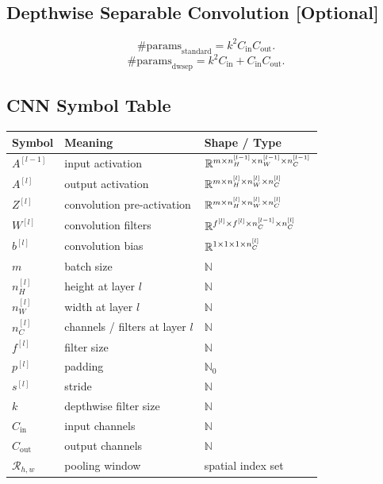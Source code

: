 \subsection{Depthwise Separable Convolution \textbf{[Optional]}}

\[
\#\mathrm{params}_{\mathrm{standard}}
=
k^2 C_{\mathrm{in}} C_{\mathrm{out}}.
\]
\[
\#\mathrm{params}_{\mathrm{dwsep}}
=
k^2 C_{\mathrm{in}}
+
C_{\mathrm{in}} C_{\mathrm{out}}.
\]

\subsection{CNN Symbol Table}

\begin{center}
\begin{tabular}{lll}
\toprule
Symbol & Meaning & Shape / Type \\
\midrule
$A^{[l-1]}$ & input activation & $\mathbb{R}^{m \times n_H^{[l-1]} \times n_W^{[l-1]} \times n_C^{[l-1]}}$ \\
$A^{[l]}$ & output activation & $\mathbb{R}^{m \times n_H^{[l]} \times n_W^{[l]} \times n_C^{[l]}}$ \\
$Z^{[l]}$ & convolution pre-activation & $\mathbb{R}^{m \times n_H^{[l]} \times n_W^{[l]} \times n_C^{[l]}}$ \\
$W^{[l]}$ & convolution filters & $\mathbb{R}^{f^{[l]} \times f^{[l]} \times n_C^{[l-1]} \times n_C^{[l]}}$ \\
$b^{[l]}$ & convolution bias & $\mathbb{R}^{1 \times 1 \times 1 \times n_C^{[l]}}$ \\
$m$ & batch size & $\mathbb{N}$ \\
$n_H^{[l]}$ & height at layer $l$ & $\mathbb{N}$ \\
$n_W^{[l]}$ & width at layer $l$ & $\mathbb{N}$ \\
$n_C^{[l]}$ & channels / filters at layer $l$ & $\mathbb{N}$ \\
$f^{[l]}$ & filter size & $\mathbb{N}$ \\
$p^{[l]}$ & padding & $\mathbb{N}_0$ \\
$s^{[l]}$ & stride & $\mathbb{N}$ \\
$k$ & depthwise filter size & $\mathbb{N}$ \\
$C_{\mathrm{in}}$ & input channels & $\mathbb{N}$ \\
$C_{\mathrm{out}}$ & output channels & $\mathbb{N}$ \\
$\mathcal{R}_{h,w}$ & pooling window & spatial index set \\
\bottomrule
\end{tabular}
\end{center}
